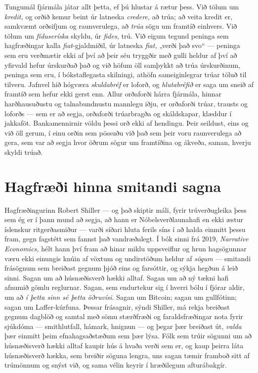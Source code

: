 Tungumál fjármála játar allt þetta, ef þú hlustar á rætur þess. Við tölum um \emph{kredit,} og orðið kemur beint úr latneska \emph{credere,} að trúa; að veita kredit er, samkvæmt orðsifjum og raunverulega, að \emph{trúa} sögu um framtíð einhvers. Við tölum um \emph{fíduseríska} skyldu, úr \emph{fides,} trú. Við eigum tegund peninga sem hagfræðingar kalla \emph{fiat}-gjaldmiðil, úr latneska \emph{fiat,} „verði það svo“ — peninga sem eru verðmætir ekki af því að þeir séu tryggðir með gulli heldur af því að yfirvald hefur úrskurðað það og við höfum öll samþykkt að trúa úrskurðinum, peninga sem eru, í bókstaflegasta skilningi, athöfn sameiginlegrar trúar töluð til tilveru. Jafnvel hið hógværa \emph{skuldabréf} er loforð, og \emph{hlutabréfið} er saga um sneið af framtíð sem hefur ekki gerst enn. Allur orðaforði hárra fjármála, hinnar harðhausuðustu og talnabundnustu mannlegu iðju, er orðaforði trúar, trausts og loforðs — sem er að segja, orðaforði trúarbragða og skáldskapar, klæddur í jakkaföt. Bankamennirnir völdu þessi orð ekki af hendingu. Þeir seildust, eins og við öll gerum, í einu orðin sem pössuðu við það sem þeir voru raunverulega að gera, sem var að segja hvor öðrum sögur um framtíðina og ákveða, saman, hverju skyldi trúað.

\section*{Hagfræði hinna smitandi sagna}

Hagfræðingurinn Robert Shiller — og það skiptir máli, fyrir trúverðugleika þess sem ég er í þann mund að segja, að hann er Nóbelsverðlaunahafi en ekki æstur íslenskur ritgerðasmiður — varði síðari hluta ferils síns í að halda einmitt þessu fram, gegn fagstétt sem fannst það vandræðalegt. Í bók sinni frá 2019, \emph{Narrative Economics,} hélt hann því fram að hinar miklu uppsveiflur og hrun hagsögunnar væru ekki einungis knúin af vöxtum og undirstöðum heldur af \emph{sögum} — smitandi frásögnum sem breiðast gegnum þjóð eins og farsóttir, og sýkja hegðun á leið sinni. Sagan um að húsnæðisverð hækki alltaf. Sagan um að ný tækni hafi afnumið gömlu reglurnar. Sagan, sem endurtekur sig í hverri bólu í fjórar aldir, um að \emph{í þetta sinn sé þetta öðruvísi.} Sagan um Bitcoin; sagan um gullfótinn; sagan um Laffer-kúrfuna. Þessar frásagnir, sýndi Shiller, má rekja breiðast gegnum dagblöð og samtal með sömu stærðfræði og faraldsfræðingar nota fyrir sjúkdóma — smithlutfall, hámark, hnignun — og þegar þær breiðast út, \emph{valda} þær einmitt þeim efnahagsaðstæðum sem þær lýsa. Fólk sem trúir sögunni um að húsnæðisverð hækki alltaf kaupir hús á hvaða verði sem er, og kaup þeirra láta húsnæðisverð hækka, sem breiðir söguna lengra, uns sagan tæmir framboð sitt af trúmönnum og snýst við, og sama vélin keyrir í hræðilegum afturábakgír.

